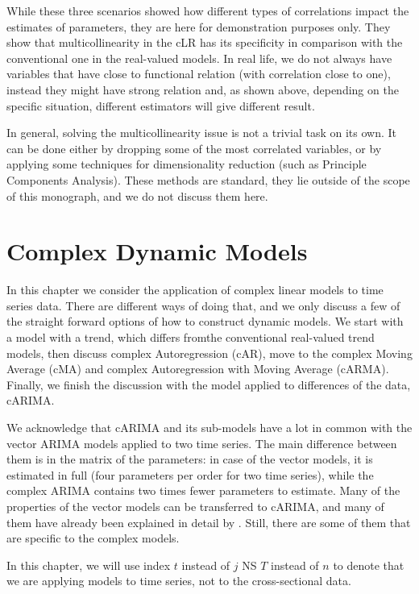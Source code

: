 \documentclass[
]{book}
\begin{document}
While these three scenarios showed how different types of correlations impact the estimates of parameters, they are here for demonstration purposes only. They show that multicollinearity in the cLR has its specificity in comparison with the conventional one in the real-valued models. In real life, we do not always have variables that have close to functional relation (with correlation close to one), instead they might have strong relation and, as shown above, depending on the specific situation, different estimators will give different result.

In general, solving the multicollinearity issue is not a trivial task on its own. It can be done either by dropping some of the most correlated variables, or by applying some techniques for dimensionality reduction (such as Principle Components Analysis). These methods are standard, they lie outside of the scope of this monograph, and we do not discuss them here.

\hypertarget{Dynamic}{%
\chapter{Complex Dynamic Models}\label{Dynamic}}

In this chapter we consider the application of complex linear models to time series data. There are different ways of doing that, and we only discuss a few of the straight forward options of how to construct dynamic models. We start with a model with a trend, which differs fromthe conventional real-valued trend models, then discuss complex Autoregression (cAR), move to the complex Moving Average (cMA) and complex Autoregression with Moving Average (cARMA). Finally, we finish the discussion with the model applied to differences of the data, cARIMA.

We acknowledge that cARIMA and its sub-models have a lot in common with the vector ARIMA models applied to two time series. The main difference between them is in the matrix of the parameters: in case of the vector models, it is estimated in full (four parameters per order for two time series), while the complex ARIMA contains two times fewer parameters to estimate. Many of the properties of the vector models can be transferred to cARIMA, and many of them have already been explained in detail by \citet{Lutkepohl2005}. Still, there are some of them that are specific to the complex models.

In this chapter, we will use index \(t\) instead of \(j\) NS \(T\) instead of \(n\) to denote that we are applying models to time series, not to the cross-sectional data.
\end{document}
